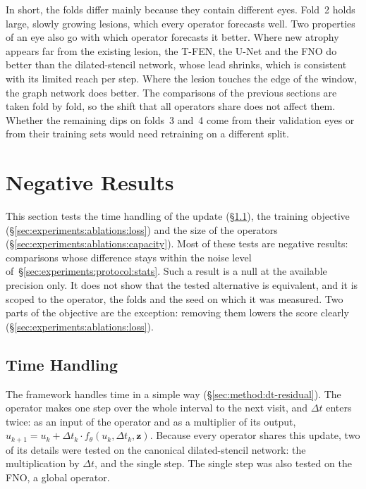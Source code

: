 In short, the folds differ mainly because they contain different eyes.
Fold~2 holds large, slowly growing lesions, which every operator forecasts
well. Two properties of an eye also go with which operator forecasts it
better. Where new atrophy appears far from the existing lesion, the T-FEN,
the U-Net and the FNO do better than the dilated-stencil network, whose lead
shrinks, which is consistent with its limited reach per step. Where the
lesion touches the edge of the window, the graph network does better. The comparisons of the previous
sections are taken fold by fold, so the shift that all operators share
does not affect them. Whether the remaining dips on folds~3 and~4 come
from their validation eyes or from their training sets would need
retraining on a different split.


\section{Negative Results}
\label{sec:experiments:ablations}

This section tests the time handling of the update
(\S\ref{sec:experiments:ablations:time}), the training objective
(\S\ref{sec:experiments:ablations:loss}) and the size of the operators
(\S\ref{sec:experiments:ablations:capacity}). Most of
these tests are negative results: comparisons whose difference stays
within the noise level of~\S\ref{sec:experiments:protocol:stats}. Such a
result is a null at the available precision only. It does not show that
the tested alternative is equivalent, and it is scoped to the operator,
the folds and the seed on which it was measured. Two parts of the
objective are the exception: removing them lowers the score clearly
(\S\ref{sec:experiments:ablations:loss}).

\subsection{Time Handling}
\label{sec:experiments:ablations:time}

The framework handles time in a simple way
(\S\ref{sec:method:dt-residual}). The operator makes one step over the
whole interval to the next visit, and $\Delta t$ enters twice: as an input
of the operator and as a multiplier of its output,
$\hat u_{k+1} = u_k + \Delta t_k \cdot f_\theta(u_k, \Delta t_k, \mathbf{z})$.
Because every operator shares this update, two of its details were tested
on the canonical dilated-stencil network: the multiplication by
$\Delta t$, and the single step. The single step was also tested on the
FNO, a global operator.

